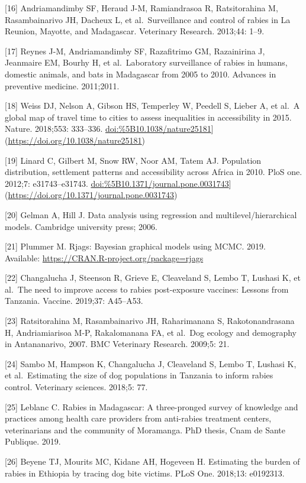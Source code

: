 \documentclass[
  oneside]{book}
\begin{document}
{[}16{]} Andriamandimby SF, Heraud J-M, Ramiandrasoa R, Ratsitorahina M,
Rasambainarivo JH, Dacheux L, et al.~Surveillance and control of rabies
in La Reunion, Mayotte, and Madagascar. Veterinary Research. 2013;44:
1--9.

{[}17{]} Reynes J-M, Andriamandimby SF, Razafitrimo GM, Razainirina J,
Jeanmaire EM, Bourhy H, et al.~Laboratory surveillance of rabies in
humans, domestic animals, and bats in Madagascar from 2005 to 2010.
Advances in preventive medicine. 2011;2011.

{[}18{]} Weiss DJ, Nelson A, Gibson HS, Temperley W, Peedell S, Lieber A, et
al.~A global map of travel time to cities to assess inequalities in
accessibility in 2015. Nature. 2018;553: 333--336.
\url{doi:\%5B10.1038/nature25181}{]}(\url{https://doi.org/10.1038/nature25181})

{[}19{]} Linard C, Gilbert M, Snow RW, Noor AM, Tatem AJ. Population
distribution, settlement patterns and accessibility across Africa in
2010. PloS one. 2012;7: e31743--e31743.
\url{doi:\%5B10.1371/journal.pone.0031743}{]}(\url{https://doi.org/10.1371/journal.pone.0031743})

{[}20{]} Gelman A, Hill J. Data analysis using regression and
multilevel/hierarchical models. Cambridge university press; 2006.

{[}21{]} Plummer M. Rjags: Bayesian graphical models using MCMC. 2019.
Available: \url{https://CRAN.R-project.org/package=rjags}

{[}22{]} Changalucha J, Steenson R, Grieve E, Cleaveland S, Lembo T, Lushasi
K, et al.~The need to improve access to rabies post-exposure vaccines:
Lessons from Tanzania. Vaccine. 2019;37: A45--A53.

{[}23{]} Ratsitorahina M, Rasambainarivo JH, Raharimanana S,
Rakotonandrasana H, Andriamiarisoa M-P, Rakalomanana FA, et al.~Dog
ecology and demography in Antananarivo, 2007. BMC Veterinary Research.
2009;5: 21.

{[}24{]} Sambo M, Hampson K, Changalucha J, Cleaveland S, Lembo T, Lushasi
K, et al.~Estimating the size of dog populations in Tanzania to inform
rabies control. Veterinary sciences. 2018;5: 77.

{[}25{]} Leblanc C. Rabies in Madagascar: A three-pronged survey of
knowledge and practices among health care providers from anti-rabies
treatment centers, veterinarians and the community of Moramanga. PhD
thesis, Cnam de Sante Publique. 2019.

{[}26{]} Beyene TJ, Mourits MC, Kidane AH, Hogeveen H. Estimating the burden
of rabies in Ethiopia by tracing dog bite victims. PLoS One. 2018;13:
e0192313.
\end{document}

